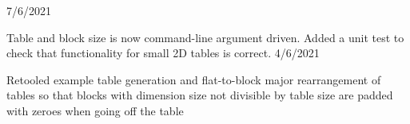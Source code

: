 7/6/2021
\begin{DoxyItemize}
\item Table and block size is now command-\/line argument driven. Added a unit test to check that functionality for small 2D tables is correct. 4/6/2021
\item Retooled example table generation and flat-\/to-\/block major rearrangement of tables so that blocks with dimension size not divisible by table size are padded with zeroes when going off the table 
\end{DoxyItemize}